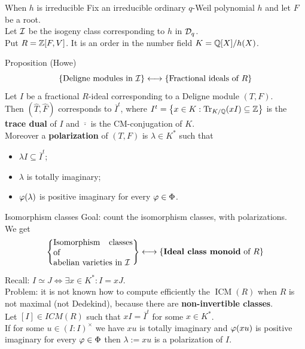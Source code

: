 \documentclass{beamer}
\DeclareMathOperator{\ICM}{ICM}
\begin{document}
\begin{frame}{When $h$ is irreducible}
  Fix an irreducible ordinary $q$-Weil polynomial $h$ and let $F$ be a root.\\
\pause
  Let ${\mathcal I}$ be the isogeny class corresponding to $h$ in ${\mathcal D}_q$.\\
\pause
  Put $R=\mathbb{Z}[F,V]$. It is an order in the number field $K=\mathbb{Q}[X]/h(X)$.\\
\pause
  \begin{alertblock}{Proposition (Howe)}
    \[\left\lbrace\text{Deligne modules in ${\mathcal I}$}\right\rbrace \longleftrightarrow \left\lbrace\text{Fractional ideals of $R$}\right\rbrace \]
\pause
    Let $I$ be a fractional $R$-ideal corresponding to a Deligne module $(T,F)$.\\
\pause
    Then $(\hat T, \hat F)$ corresponds to $\overline I ^t$, where $I^t=\left\lbrace x\in K:\operatorname{Tr}_{K/\mathbb{Q}}(xI)\subseteq \mathbb{Z}\right\rbrace$ is the \textbf{trace dual} of $I$ and $\overline{\cdot}$ is the CM-conjugation of $K$.\\
\pause
    Moreover a \textbf{polarization} of $(T,F)$ is $\lambda\in K^*$ such that
    \begin{itemize}
      \item $\lambda I \subseteq \overline I^t$;
      \item $\lambda$ is totally imaginary;
      \item ${\varphi}(\lambda)$ is positive imaginary for every ${\varphi} \in \Phi$.
    \end{itemize}
  \end{alertblock}
\end{frame}

\begin{frame}{Isomorphism classes}
  Goal: count the isomorphism classes, with polarizations.\\
\pause
  We get
  \[\set{\parbox[p]{9.5em}{Isomorphism classes of \\abelian varieties in $\cI$}} \longleftrightarrow \set{\textbf{Ideal class monoid} \text{ of $R$}}
\]

  Recall: $I \simeq J \Longleftrightarrow \exists x\in K^* : I=xJ$.\\
\pause
  Problem: it is not known how to compute efficiently the $\ICM(R)$ when $R$ is not maximal (not Dedekind), because there are \textbf{non-invertible classes}.\\
\pause
  Let $[I]\in ICM(R)$ such that $x I = \overline I^t$ for some $x\in K^*$.\\
\pause
  If for some $u\in (I:I)^\times$ we have $xu$ is totally imaginary and ${\varphi}(xu)$ is positive imaginary for every ${\varphi} \in \Phi$ then $\lambda:=xu$ is a polarization of $I$.
\end{frame}
\end{document}
